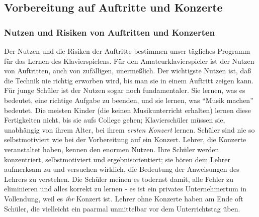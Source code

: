 
\subsection{Vorbereitung auf Auftritte und Konzerte}
\label{c1iii14} 

\subsubsection{Nutzen und Risiken von Auftritten und Konzerten}
\label{c1iii14a}

Der Nutzen und die Risiken der Auftritte bestimmen unser tägliches Programm für das Lernen des Klavierspielens.
Für den Amateurklavierspieler ist der Nutzen von Auftritten, auch von zufälligen, unermeßlich.
Der wichtigste Nutzen ist, daß die Technik nie richtig erworben wird, bis man sie in einem Auftritt zeigen kann.
Für junge Schüler ist der Nutzen sogar noch fundamentaler.
Sie lernen, was es bedeutet, eine richtige Aufgabe zu beenden, und sie lernen, was \enquote{Musik machen} bedeutet.
Die meisten Kinder (die keinen Musikunterricht erhalten) lernen diese Fertigkeiten nicht, bis sie aufs College gehen; Klavierschüler müssen sie, unabhängig von ihrem Alter, bei ihrem \textit{ersten Konzert} lernen.
Schüler sind nie so selbstmotiviert wie bei der Vorbereitung auf ein Konzert.
Lehrer, die Konzerte veranstaltet haben, kennen den enormen Nutzen.
Ihre Schüler werden konzentriert, selbstmotiviert und ergebnisorientiert; sie hören dem Lehrer aufmerksam zu und versuchen wirklich, die Bedeutung der Anweisungen des Lehrers zu verstehen.
Die Schüler meinen es todernst damit, alle Fehler zu eliminieren und alles korrekt zu lernen - es ist ein privates Unternehmertum in Vollendung, weil es \textit{ihr} Konzert ist.
Lehrer ohne Konzerte haben am Ende oft Schüler, die vielleicht ein paarmal unmittelbar vor dem Unterrichtstag üben.

